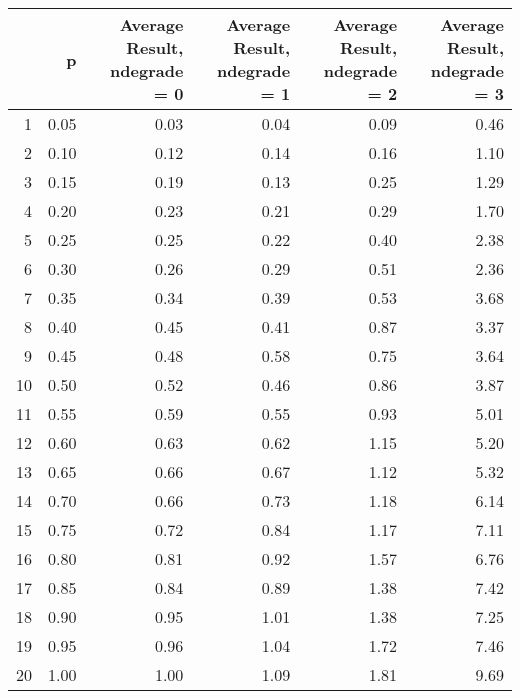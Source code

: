 \begin{table}[ht]
\centering
\begin{tabular}{rrrrrr}
  \hline
 & p & Average Result, ndegrade = 0 & Average Result, ndegrade = 1 & Average Result, ndegrade = 2 & Average Result, ndegrade = 3 \\ 
  \hline
1 & 0.05 & 0.03 & 0.04 & 0.09 & 0.46 \\ 
  2 & 0.10 & 0.12 & 0.14 & 0.16 & 1.10 \\ 
  3 & 0.15 & 0.19 & 0.13 & 0.25 & 1.29 \\ 
  4 & 0.20 & 0.23 & 0.21 & 0.29 & 1.70 \\ 
  5 & 0.25 & 0.25 & 0.22 & 0.40 & 2.38 \\ 
  6 & 0.30 & 0.26 & 0.29 & 0.51 & 2.36 \\ 
  7 & 0.35 & 0.34 & 0.39 & 0.53 & 3.68 \\ 
  8 & 0.40 & 0.45 & 0.41 & 0.87 & 3.37 \\ 
  9 & 0.45 & 0.48 & 0.58 & 0.75 & 3.64 \\ 
  10 & 0.50 & 0.52 & 0.46 & 0.86 & 3.87 \\ 
  11 & 0.55 & 0.59 & 0.55 & 0.93 & 5.01 \\ 
  12 & 0.60 & 0.63 & 0.62 & 1.15 & 5.20 \\ 
  13 & 0.65 & 0.66 & 0.67 & 1.12 & 5.32 \\ 
  14 & 0.70 & 0.66 & 0.73 & 1.18 & 6.14 \\ 
  15 & 0.75 & 0.72 & 0.84 & 1.17 & 7.11 \\ 
  16 & 0.80 & 0.81 & 0.92 & 1.57 & 6.76 \\ 
  17 & 0.85 & 0.84 & 0.89 & 1.38 & 7.42 \\ 
  18 & 0.90 & 0.95 & 1.01 & 1.38 & 7.25 \\ 
  19 & 0.95 & 0.96 & 1.04 & 1.72 & 7.46 \\ 
  20 & 1.00 & 1.00 & 1.09 & 1.81 & 9.69 \\ 
   \hline
\end{tabular}
\end{table}
